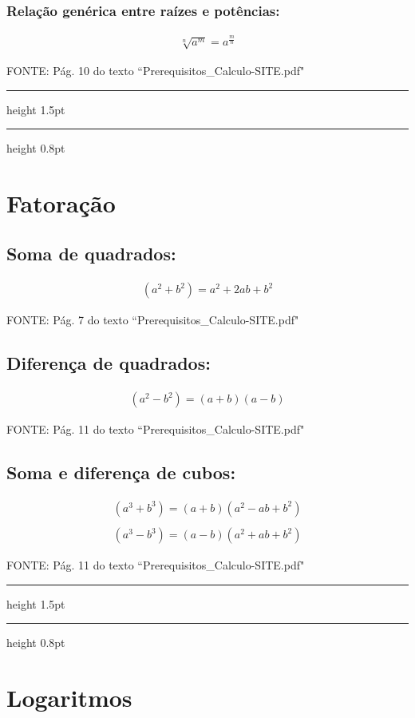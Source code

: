 \documentclass[portuguese,a4paper,12pt,onecolumn,fleqn]{article}
\newcommand{\myline}{\par
  \kern3pt %
  \hrule height 1.5pt
  \kern2pt %
  \hrule height 0.8pt
  \kern3pt %
}
\begin{document}
\subsubsection*{Relação genérica entre raízes e potências:}
\begin{gather*}
\sqrt[n]{a^m} = a^\frac{m}{n}
\end{gather*}

FONTE: Pág. 10 do texto ``Prerequisitos\_Calculo-SITE.pdf"

\myline	%

\section*{Fatoração}

\subsection*{Soma de quadrados:}
\begin{gather*}
(a^2 + b^2) = a^2 + 2ab + b^2
\end{gather*}

FONTE: Pág. 7 do texto ``Prerequisitos\_Calculo-SITE.pdf"

\subsection*{Diferença de quadrados:}
\begin{gather*}
(a^2 - b^2) = (a + b)(a - b)
\end{gather*}

FONTE: Pág. 11 do texto ``Prerequisitos\_Calculo-SITE.pdf"

\subsection*{Soma e diferença de cubos:}
\begin{gather*}
(a^3 + b^3) = (a + b)(a^2 - ab + b^2)
\\
\\
(a^3 - b^3) = (a - b)(a^2 + ab + b^2)
\end{gather*}

FONTE: Pág. 11 do texto ``Prerequisitos\_Calculo-SITE.pdf"

\myline	%

\section*{Logaritmos}
\end{document}
